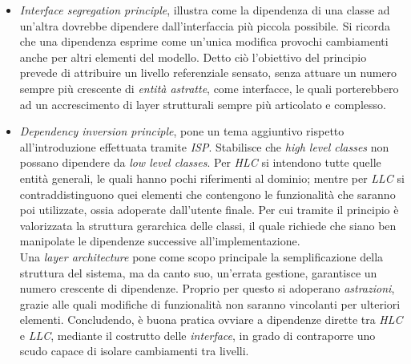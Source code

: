 \documentclass{article}
\begin{document}
\begin{itemize}[label={-}]
    \item \textit{Interface segregation principle}, illustra come la dipendenza di una classe ad un'altra dovrebbe dipendere dall'interfaccia più piccola possibile. Si ricorda che una dipendenza esprime come un'unica modifica provochi cambiamenti anche per altri elementi del modello. Detto ciò l'obiettivo del principio prevede di attribuire un livello referenziale sensato, senza attuare un numero sempre più crescente di \textit{entità astratte}, come interfacce, le quali porterebbero ad un accrescimento di layer strutturali sempre più articolato e complesso.
    \item \textit{Dependency inversion principle}, pone un tema aggiuntivo rispetto all'introduzione effettuata tramite \textit{ISP}. Stabilisce che \textit{high level classes} non possano dipendere da \textit{low level classes}. Per \textit{HLC} si intendono tutte quelle entità generali, le quali hanno pochi riferimenti al dominio; mentre per \textit{LLC} si contraddistinguono quei elementi che contengono le funzionalità che saranno poi utilizzate, ossia adoperate dall'utente finale. Per cui tramite il principio è valorizzata la struttura gerarchica delle classi, il quale richiede che siano ben manipolate le dipendenze successive all'implementazione.\vspace*{14pt}\\ Una \textit{layer architecture} pone come scopo principale la semplificazione della struttura del sistema, ma da canto suo, un'errata gestione, garantisce un numero crescente di dipendenze. Proprio per questo si adoperano \textit{astrazioni}, grazie alle quali modifiche di funzionalità non saranno vincolanti per ulteriori elementi. Concludendo, è buona pratica ovviare a dipendenze dirette tra \textit{HLC} e \textit{LLC}, mediante il costrutto delle \textit{interface}, in grado di contraporre uno scudo capace di isolare cambiamenti tra livelli. 
\end{itemize}
\end{document}
